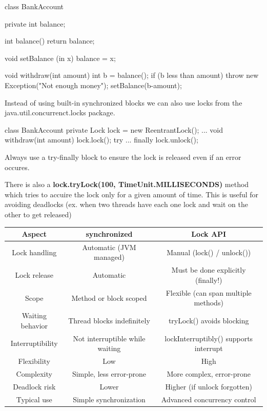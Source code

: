 \begin{codeexample}
class BankAccount {
    private int balance;

    int balance() {return balance;}

    void setBalance (in x) {balance = x;}

    void withdraw(int amount) {
        int b = balance();
        if (b less than amount) {
            throw new Exception("Not enough money");
        }
        setBalance(b-amount);
    }
}
\end{codeexample}

Instead of using built-in synchronized blocks we can also use locks from the java.util.concurrenct.locks package.

\begin{codeexample}
class BankAccount {
    private Lock lock = new ReentrantLock();
    ...
    void withdraw(int amount) {
        lock.lock();
        try {
            ...
        } finally {
            lock.unlock();
        }
    }
}
            
\end{codeexample}

\begin{important}
    Always use a try-finally block to ensure the lock is released even if an error occures.            
\end{important}

\begin{remark}
    There is also a \textbf{lock.tryLock(100, TimeUnit.MILLISECONDS)} method which tries to accuire the lock only for
    a given amount of time. This is useful for avoiding deadlocks (ex. when two threads have each one lock
    and wait on the other to get released)
\end{remark}

\begin{tabular}{|c|c|c|}
\hline
\textbf{Aspect} & \textbf{synchronized} & \textbf{Lock API} \\\hline
Lock handling & Automatic (JVM managed) & Manual (lock() / unlock()) \\\hline
Lock release & Automatic & Must be done explicitly (finally!) \\\hline
Scope & Method or block scoped & Flexible (can span multiple methods) \\\hline
Waiting behavior & Thread blocks indefinitely & tryLock() avoids blocking \\\hline
Interruptibility & Not interruptible while waiting & lockInterruptibly() supports interrupt \\\hline
Flexibility & Low & High \\\hline
Complexity & Simple, less error-prone & More complex, error-prone \\\hline
Deadlock risk & Lower & Higher (if unlock forgotten) \\\hline
Typical use & Simple synchronization & Advanced concurrency control \\\hline
\end{tabular}




